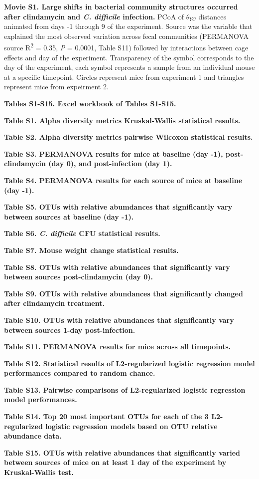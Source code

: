 \documentclass[
  11pt,
]{article}
\begin{document}
\textbf{Movie S1. Large shifts in bacterial community structures
occurred after clindamycin and \emph{C. difficile} infection.} PCoA of
\(\theta_{YC}\) distances animated from days -1 through 9 of the
experiment. Source was the variable that explained the most observed
variation across fecal communities (PERMANOVA source
R\textsuperscript{2} = 0.35, \emph{P} = 0.0001, Table S11) followed by
interactions between cage effects and day of the experiment.
Transparency of the symbol corresponds to the day of the experiment,
each symbol represents a sample from an individual mouse at a specific
timepoint. Circles represent mice from experiment 1 and triangles
represent mice from expeirment 2.

\textbf{Tables S1-S15. Excel workbook of Tables S1-S15.}

\textbf{Table S1. Alpha diversity metrics Kruskal-Wallis statistical
results.}

\textbf{Table S2. Alpha diversity metrics pairwise Wilcoxon statistical
results.}

\textbf{Table S3. PERMANOVA results for mice at baseline (day -1),
post-clindamycin (day 0), and post-infection (day 1).}

\textbf{Table S4. PERMANOVA results for each source of mice at baseline
(day -1).}

\textbf{Table S5. OTUs with relative abumdances that significantly vary
between sources at baseline (day -1).}

\textbf{Table S6. \emph{C. difficile} CFU statistical results.}

\textbf{Table S7. Mouse weight change statistical results.}

\textbf{Table S8. OTUs with relative abundances that significantly vary
between sources post-clindamycin (day 0).}

\textbf{Table S9. OTUs with relative abundances that significantly
changed after clindamycin treatment.}

\textbf{Table S10. OTUs with relative abundances that significantly vary
between sources 1-day post-infection.}

\textbf{Table S11. PERMANOVA results for mice across all timepoints.}

\textbf{Table S12. Statistical results of L2-regularized logistic
regression model performances compared to random chance.}

\textbf{Table S13. Pairwise comparisons of L2-regularized logistic
regression model performances.}

\textbf{Table S14. Top 20 most important OTUs for each of the 3
L2-regularized logistic regression models based on OTU relative
abundance data.}

\textbf{Table S15. OTUs with relative abundances that significantly
varied between sources of mice on at least 1 day of the experiment by
Kruskal-Wallis test.}
\end{document}
